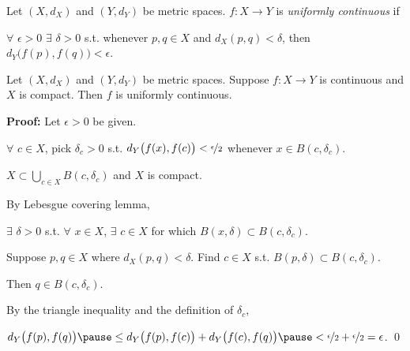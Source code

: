 \documentclass[10pt,aspectratio=149]{beamer}
\begin{document}
\begin{frame}

\begin{definition}
Let $(X,d_X)$ and $(Y,d_Y)$ be metric spaces.
$f \colon X \to Y$ is
\emph{uniformly continuous} if

\pause
$\forall$ $\epsilon > 0$
$\exists$ $\delta > 0$ s.t. whenever $p,q \in X$ and
$d_X(p,q) < \delta$, then
$d_Y\bigl(f(p),f(q)\bigr) < \epsilon$.
\end{definition}

\pause
\begin{theorem}
Let $(X,d_X)$ and $(Y,d_Y)$ be metric spaces.
Suppose $f \colon X \to Y$ is continuous and $X$ is compact.
\pause
Then $f$ is uniformly continuous.
\end{theorem}

\pause
\textbf{Proof:}
Let $\epsilon > 0$ be given.

\pause
$\forall$ $c \in X$,
pick $\delta_c > 0$ s.t.
$d_Y\bigl(f(x),f(c)\bigr) < \nicefrac{\epsilon}{2}$
whenever
$x \in B(c,\delta_c)$.

\pause
$X \subset \bigcup_{c \in X} B(c,\delta_c)$ and $X$ is compact.  

\pause
By Lebesgue covering lemma,

$\exists$ $\delta > 0$
s.t. $\forall$ $x \in X$,
$\exists$ $c \in X$
for which $B(x,\delta) \subset B(c,\delta_c)$.

\pause
\medskip

Suppose $p, q \in X$ where $d_X(p,q) < \delta$.
Find $c \in X$ s.t. $B(p,\delta) \subset B(c,\delta_c)$.

\pause
Then $q \in B(c,\delta_c)$.

\pause
By the triangle inequality
and the definition of $\delta_c$,

\medskip

$
d_Y\bigl(f(p),f(q)\bigr)
\pause
\leq
d_Y\bigl(f(p),f(c)\bigr)
+
d_Y\bigl(f(c),f(q)\bigr)
\pause
<
\nicefrac{\epsilon}{2}+
\nicefrac{\epsilon}{2} = \epsilon$.
\qed

\end{frame}
\end{document}
